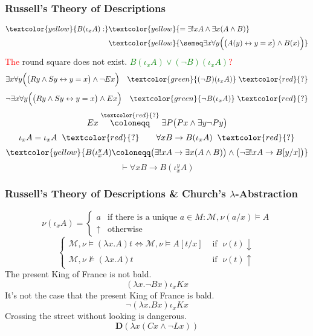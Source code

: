 \documentclass[UTF8,11pt,colorlinks,compress,openany]{beamer}%
\begin{document}
\begin{frame}\frametitle{Russell's Theory of Descriptions}
\begin{align*}
\textcolor{yellow}{B(\iota_x A):}&\textcolor{yellow}{=\exists! x A\wedge\exists x(A\wedge B)}\\
&\textcolor{yellow}{\semeq\exists x\forall y\Big(\big(A(y)\leftrightarrow y=x\big)\wedge B(x)\Big)}
\end{align*}
\textcolor{red}{The} round square does not exist. \textcolor{green}{$B(\iota_x A)\vee(\neg B)(\iota_x A)$}\;\textcolor{red}{?}
\[\exists x\forall y\Big(\big(Ry\wedge Sy\leftrightarrow y=x\big)\wedge\neg Ex\Big)\quad\textcolor{green}{(\neg B)(\iota_x A)}\;\textcolor{red}{?}\]
\[\neg\exists x\forall y\Big(\big(Ry\wedge Sy\leftrightarrow y=x\big)\wedge Ex\Big)\quad\textcolor{green}{\neg B(\iota_x A)}\;\textcolor{red}{?}\]
\[Ex\stackrel{\textcolor{red}{?}}{\coloneqq }\exists P\big(Px\wedge\exists y\neg Py\big)\]
\[\iota_x A=\iota_x A\;\;\textcolor{red}{?}\qquad \forall x B\to B(\iota_x A)\;\;\textcolor{red}{?}\]
\[\textcolor{yellow}{B(\iota_x^y A)\coloneqq \big(\exists!x A\to\exists x(A\wedge B)\big)\wedge\big(\neg\exists!x A\to B[y/x]\big)}\]
\[\vdash\forall x B\to B(\iota_x^y A)\]
\end{frame}

\begin{frame}\frametitle{Russell's Theory of Descriptions \& Church's $\lambda$-Abstraction}
\[
\nu(\iota_xA)=
\begin{cases}
	a &\mbox{if there is a unique } a\in M: \mathcal{M},\nu(a/x)\vDash A\\
	\uparrow &\mbox{otherwise}
\end{cases}
\]
\[\begin{cases}
\mathcal{M},\nu\vDash(\lambda x.A)t\iff\mathcal{M},\nu\vDash A[t/x]&\mbox{ if }\; \nu(t)\downarrow\\
\mathcal{M},\nu\nvDash(\lambda x.A)t&\mbox{ if }\; \nu(t)\uparrow
\end{cases}\]
The present King of France is not bald.
\[(\lambda x.\neg Bx)\iota_xKx\]
It's not the case that the present King of France is bald.
\[\neg(\lambda x.Bx)\iota_xKx\]
Crossing the street without looking is dangerous.
\[\mathbf{D}(\lambda x(Cx\wedge\neg Lx))\]
\end{frame}
\end{document}
